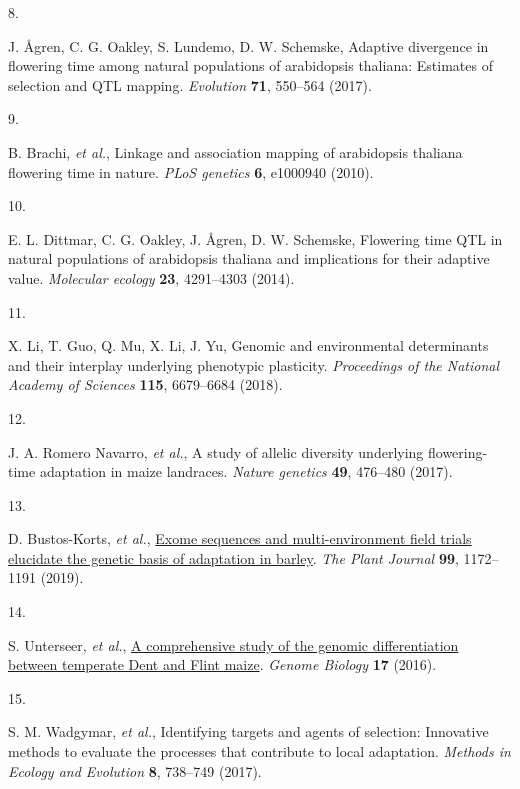 \documentclass[
  9pt,
  twocolumn,
  twoside]{pnas-new}
\newlength{\cslhangindent}
\newlength{\csllabelwidth}
\newenvironment{CSLReferences}[2] %
 {\begin{list}{}{%
  \setlength{\itemindent}{0pt}
  \setlength{\leftmargin}{0pt}
  \setlength{\parsep}{0pt}
  \ifodd #1
   \setlength{\leftmargin}{\cslhangindent}
   \setlength{\itemindent}{-1\cslhangindent}
  \fi
  \setlength{\itemsep}{#2\baselineskip}}}
 {\end{list}}
\newcommand{\CSLLeftMargin}[1]{\parbox[t]{\csllabelwidth}{\strut#1\strut}}
\newcommand{\CSLRightInline}[1]{\parbox[t]{\linewidth - \csllabelwidth}{\strut#1\strut}}
\begin{document}
\begin{CSLReferences}{0}{1}
\CSLLeftMargin{8. }%
\CSLRightInline{J. Ågren, C. G. Oakley, S. Lundemo, D. W. Schemske,
Adaptive divergence in flowering time among natural populations of
arabidopsis thaliana: Estimates of selection and QTL mapping.
\emph{Evolution} \textbf{71}, 550--564 (2017).}

\CSLLeftMargin{9. }%
\CSLRightInline{B. Brachi, \emph{et al.}, Linkage and association
mapping of arabidopsis thaliana flowering time in nature. \emph{PLoS
genetics} \textbf{6}, e1000940 (2010).}

\CSLLeftMargin{10. }%
\CSLRightInline{E. L. Dittmar, C. G. Oakley, J. Ågren, D. W. Schemske,
Flowering time QTL in natural populations of arabidopsis thaliana and
implications for their adaptive value. \emph{Molecular ecology}
\textbf{23}, 4291--4303 (2014).}

\CSLLeftMargin{11. }%
\CSLRightInline{X. Li, T. Guo, Q. Mu, X. Li, J. Yu, Genomic and
environmental determinants and their interplay underlying phenotypic
plasticity. \emph{Proceedings of the National Academy of Sciences}
\textbf{115}, 6679--6684 (2018).}

\CSLLeftMargin{12. }%
\CSLRightInline{J. A. Romero Navarro, \emph{et al.}, A study of allelic
diversity underlying flowering-time adaptation in maize landraces.
\emph{Nature genetics} \textbf{49}, 476--480 (2017).}

\CSLLeftMargin{13. }%
\CSLRightInline{D. Bustos-Korts, \emph{et al.},
\href{https://doi.org/10.1111/tpj.14414}{Exome sequences and
multi{-}environment field trials elucidate the genetic basis of
adaptation in barley}. \emph{The Plant Journal} \textbf{99}, 1172--1191
(2019).}

\CSLLeftMargin{14. }%
\CSLRightInline{S. Unterseer, \emph{et al.},
\href{https://doi.org/10.1186/s13059-016-1009-x}{A comprehensive study
of the genomic differentiation between temperate Dent and Flint maize}.
\emph{Genome Biology} \textbf{17} (2016).}

\CSLLeftMargin{15. }%
\CSLRightInline{S. M. Wadgymar, \emph{et al.}, Identifying targets and
agents of selection: Innovative methods to evaluate the processes that
contribute to local adaptation. \emph{Methods in Ecology and Evolution}
\textbf{8}, 738--749 (2017).}


\end{CSLReferences}
\end{document}
